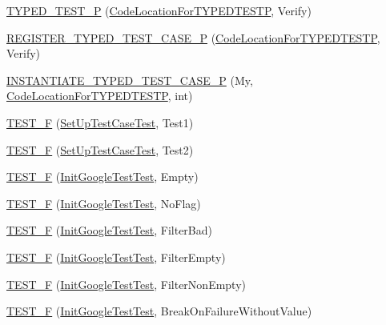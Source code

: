\begin{DoxyCompactItemize}
\item 
\hyperlink{namespacetesting_a3f3fbbc7ecc23117307b81deb8f4cfac}{T\+Y\+P\+E\+D\+\_\+\+T\+E\+S\+T\+\_\+P} (\hyperlink{classtesting_1_1_code_location_for_t_y_p_e_d_t_e_s_t_p}{Code\+Location\+For\+T\+Y\+P\+E\+D\+T\+E\+S\+TP}, Verify)
\item 
\hyperlink{namespacetesting_a9fc96ebb1c0e7db169c4a5697c903f56}{R\+E\+G\+I\+S\+T\+E\+R\+\_\+\+T\+Y\+P\+E\+D\+\_\+\+T\+E\+S\+T\+\_\+\+C\+A\+S\+E\+\_\+P} (\hyperlink{classtesting_1_1_code_location_for_t_y_p_e_d_t_e_s_t_p}{Code\+Location\+For\+T\+Y\+P\+E\+D\+T\+E\+S\+TP}, Verify)
\item 
\hyperlink{namespacetesting_a111c1dea1140652727ab97ddc13eb045}{I\+N\+S\+T\+A\+N\+T\+I\+A\+T\+E\+\_\+\+T\+Y\+P\+E\+D\+\_\+\+T\+E\+S\+T\+\_\+\+C\+A\+S\+E\+\_\+P} (My, \hyperlink{classtesting_1_1_code_location_for_t_y_p_e_d_t_e_s_t_p}{Code\+Location\+For\+T\+Y\+P\+E\+D\+T\+E\+S\+TP}, int)
\item 
\hyperlink{namespacetesting_a01e948eb5427d31f70eafaf472e2bfa8}{T\+E\+S\+T\+\_\+F} (\hyperlink{classtesting_1_1_set_up_test_case_test}{Set\+Up\+Test\+Case\+Test}, Test1)
\item 
\hyperlink{namespacetesting_a8fc2e448ce96e4da357a2129d49e86e3}{T\+E\+S\+T\+\_\+F} (\hyperlink{classtesting_1_1_set_up_test_case_test}{Set\+Up\+Test\+Case\+Test}, Test2)
\item 
\hyperlink{namespacetesting_ae80ccfaa178730f49af649cd044e84e4}{T\+E\+S\+T\+\_\+F} (\hyperlink{classtesting_1_1_init_google_test_test}{Init\+Google\+Test\+Test}, Empty)
\item 
\hyperlink{namespacetesting_add96563b5ca11c20fe2766a848c2bb63}{T\+E\+S\+T\+\_\+F} (\hyperlink{classtesting_1_1_init_google_test_test}{Init\+Google\+Test\+Test}, No\+Flag)
\item 
\hyperlink{namespacetesting_ab368a135e5a7a59bceb912a5f636004a}{T\+E\+S\+T\+\_\+F} (\hyperlink{classtesting_1_1_init_google_test_test}{Init\+Google\+Test\+Test}, Filter\+Bad)
\item 
\hyperlink{namespacetesting_a04d011d2e5695513c45216ae1b98095b}{T\+E\+S\+T\+\_\+F} (\hyperlink{classtesting_1_1_init_google_test_test}{Init\+Google\+Test\+Test}, Filter\+Empty)
\item 
\hyperlink{namespacetesting_a69dcb047e8cf4f93e8132faf11ba7110}{T\+E\+S\+T\+\_\+F} (\hyperlink{classtesting_1_1_init_google_test_test}{Init\+Google\+Test\+Test}, Filter\+Non\+Empty)
\item 
\hyperlink{namespacetesting_afc3e46c96f27aa2b502b15e8e4bab2ca}{T\+E\+S\+T\+\_\+F} (\hyperlink{classtesting_1_1_init_google_test_test}{Init\+Google\+Test\+Test}, Break\+On\+Failure\+Without\+Value)

\end{DoxyCompactItemize}
